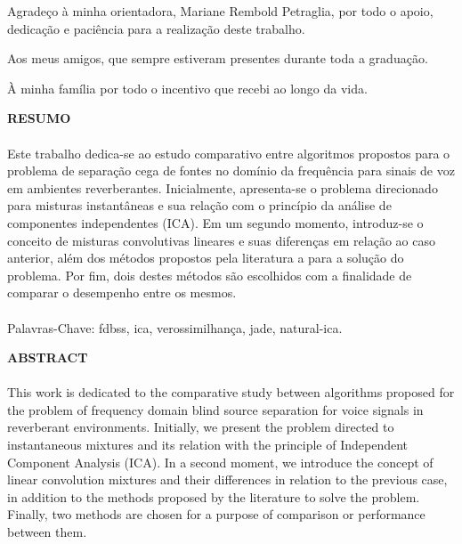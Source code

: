 Agradeço à minha orientadora, Mariane Rembold Petraglia, por todo o apoio, dedicação e paciência para a realização deste trabalho. 

Aos meus amigos, que sempre estiveram presentes durante toda a graduação.

À minha família por todo o incentivo que recebi ao longo da vida.

\pagebreak


\begin{center}
\textbf{RESUMO}
\end{center}
      \vspace{0.5cm}

\paragraph{}
Este trabalho dedica-se ao estudo comparativo entre algoritmos propostos para o problema de separação cega de fontes no domínio da frequência para sinais de voz em ambientes reverberantes. Inicialmente, apresenta-se o problema direcionado para misturas instantâneas e sua relação com o princípio da análise de componentes independentes (ICA). Em um segundo momento, introduz-se o conceito de misturas convolutivas lineares e suas diferenças em relação ao caso anterior, além dos métodos propostos pela literatura a para a solução do problema. Por fim, dois destes métodos são escolhidos com a finalidade de comparar o desempenho entre os mesmos.

\paragraph{}
\noindent Palavras-Chave: fdbss, ica, verossimilhança, jade, natural-ica.

\pagebreak


\begin{center}
\textbf{ABSTRACT}
\end{center}
      \vspace{0.5cm}

\paragraph{}
This work is dedicated to the comparative study between algorithms proposed for the problem of frequency domain blind source separation for voice signals in reverberant environments. Initially, we present the problem directed to instantaneous mixtures and its relation with the principle of Independent Component Analysis (ICA). In a second moment, we introduce the concept of linear convolution mixtures and their differences in relation to the previous case, in addition to the methods proposed by the literature to solve the problem. Finally, two methods are chosen for a purpose of comparison or performance between them.

